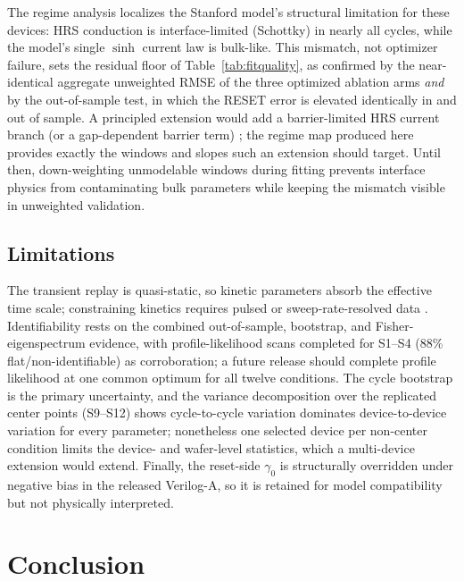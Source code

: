 \documentclass[journal]{IEEEtran}
\begin{document}
The regime analysis localizes the Stanford model's structural limitation for
these devices: HRS conduction is interface-limited (Schottky) in nearly all
cycles, while the model's single $\sinh$ current law is bulk-like.  This
mismatch, not optimizer failure, sets the residual floor of
Table~\ref{tab:fitquality}, as confirmed by the near-identical aggregate
unweighted RMSE of the three optimized ablation arms \emph{and} by the
out-of-sample test, in which the RESET error is elevated identically in and
out of sample.  A principled extension would add a barrier-limited HRS current
branch (or a gap-dependent barrier term)
\cite{chiu2014,bocquet2014,bengel2020jart}; the regime map produced here
provides exactly the windows and slopes such an extension should target.
Until then, down-weighting unmodelable windows during fitting prevents
interface physics from contaminating bulk parameters while keeping the
mismatch visible in unweighted validation.

\subsection{Limitations}

The transient replay is quasi-static, so kinetic parameters absorb the
effective time scale; constraining kinetics requires pulsed or
sweep-rate-resolved data \cite{ielmini2016}.  Identifiability rests on the
combined out-of-sample, bootstrap, and Fisher-eigenspectrum evidence, with
profile-likelihood scans completed for S1--S4 (88\% flat/non-identifiable) as
corroboration; a future release should complete profile likelihood at one
common optimum for all twelve conditions.  The cycle bootstrap is the primary
uncertainty, and the variance decomposition over the replicated center points
(S9--S12) shows cycle-to-cycle variation dominates device-to-device variation
for every parameter; nonetheless one selected device per non-center condition
limits the device- and wafer-level statistics, which a multi-device extension
would extend.  Finally, the reset-side $\gamma_0$ is structurally overridden
under negative bias in the released Verilog-A, so it is retained for model
compatibility but not physically interpreted.

\section{Conclusion}
\label{sec:conclusion}
\end{document}
